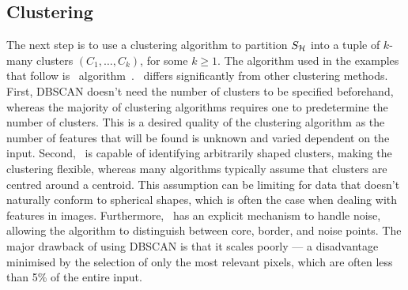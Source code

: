 \subsection{Clustering}
The next step is to use a clustering algorithm to partition $S_{\mathcal{H}}$ into a tuple of $k$-many clusters $(C_1,\dots, C_k)$, for some $k\geq 1$. The algorithm used in the examples that follow is \DBSCAN\ algorithm~\cite{EsterKSX96}. \DBSCAN\ differs significantly from other clustering methods. First, DBSCAN doesn't need the number of clusters to be specified beforehand, whereas the majority of clustering algorithms requires one to predetermine the number of clusters. This is a desired quality of the clustering algorithm as the number of features that will be found is unknown and varied dependent on the input. Second, \DBSCAN\ is capable of identifying arbitrarily shaped clusters, making the clustering flexible, whereas many algorithms typically assume that clusters are centred around a centroid. This assumption can be limiting for data that doesn't naturally conform to spherical shapes, which is often the case when dealing with features in images. Furthermore, \DBSCAN\ has an explicit mechanism to handle noise, allowing the algorithm to distinguish between core, border, and noise points. The major drawback of using DBSCAN is that it scales poorly --- a disadvantage minimised by the selection of only the most relevant pixels, which are often less than 5\% of the entire input. 

